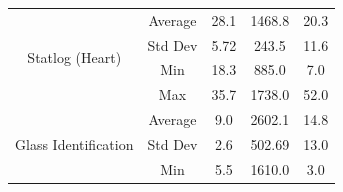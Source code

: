 \documentclass[journal]{IEEEtran}
\begin{document}
\begin{table}[]
\begin{tabular}{|c|c|c|c|c|}
			\multirow{4}{*}{Statlog (Heart)}       & Average                                  & 28.1                                                                                          & 1468.8                                                                                                          & 20.3                                                                                                \\ \cline{2-5} 
			& Std Dev                                  & 5.72                                                                                          & 243.5                                                                                                           & 11.6                                                                                                \\ \cline{2-5} 
			& Min                                      & 18.3                                                                                          & 885.0                                                                                                           & 7.0                                                                                                 \\ \cline{2-5} 
			& Max                                      & 35.7                                                                                          & 1738.0                                                                                                          & 52.0                                                                                                \\ \hline
			\multirow{4}{*}{Glass Identification}  & Average                                  & 9.0                                                                                          & 2602.1                                                                                                          & 14.8                                                                                                \\ \cline{2-5} 
			& Std Dev                                  & 2.6                                                                                           & 502.69                                                                                                          & 13.0                                                                                                \\ \cline{2-5} 
			& Min                                      & 5.5                                                                                          & 1610.0                                                                                                          & 3.0                                                                                                 \\ \cline{2-5} 

\end{tabular}
\end{table}
\end{document}
